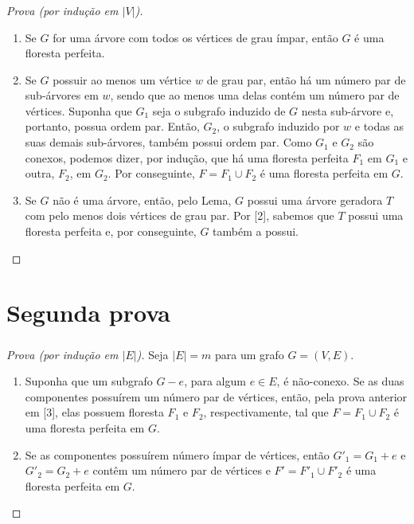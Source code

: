 \documentclass{beamer}
\begin{document}
\begin{frame}
    \frametitle{}

    \begin{proof}[Prova (por indução em $|V|$)]
        \begin{enumerate}
            \item Se $G$ for uma árvore com todos os vértices de grau ímpar, então $G$ é uma floresta perfeita.
            \item Se $G$ possuir ao menos um vértice $w$ de grau par, então há um número par de sub-árvores em $w$, sendo que ao menos uma delas contém um número par de vértices. Suponha que $G_{1}$ seja o subgrafo induzido de $G$ nesta sub-árvore e, portanto, possua ordem par. Então, $G_{2}$, o subgrafo induzido por $w$ e todas as suas demais sub-árvores, também possui ordem par. Como $G_{1}$ e $G_{2}$ são conexos, podemos dizer, por indução, que há uma floresta perfeita $F_{1}$ em $G_{1}$ e outra, $F_{2}$, em $G_{2}$. Por conseguinte, $F = F_{1} \cup F_{2}$ é uma floresta perfeita em $G$.
            \item Se $G$ não é uma árvore, então, pelo Lema, $G$ possui uma árvore geradora $T$ com pelo menos dois vértices de grau par. Por [2], sabemos que $T$ possui uma floresta perfeita e, por conseguinte, $G$ também a possui.
        \end{enumerate}
    \end{proof}

\end{frame}

\section{Segunda prova}

\begin{frame}
    \frametitle{}

    \begin{proof}[Prova (por indução em $|E|$)]
        Seja $|E| = m$ para um grafo $G = (V, E)$. 

        \begin{enumerate}
            \item Suponha que um subgrafo $G - e$, para algum $e \in E$, é não-conexo. Se as duas componentes possuírem um número par de vértices, então, pela prova anterior em [3], elas possuem floresta $F_{1}$ e $F_{2}$, respectivamente, tal que $F = F_{1} \cup F_{2}$ é uma floresta perfeita em $G$.
            \item Se as componentes possuírem número ímpar de vértices, então $G'_{1} = G_{1} + e$ e $G'_{2} = G_{2} + e$ contêm um número par de vértices e $F' = F'_{1} \cup F'_{2}$ é uma floresta perfeita em $G$.
        \end{enumerate}
    \end{proof}

\end{frame}
\end{document}
